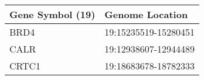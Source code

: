 \begin{tabular}{ll}
\toprule
Gene Symbol (19) &      Genome Location \\
\midrule
            BRD4 & 19:15235519-15280451 \\
            CALR & 19:12938607-12944489 \\
           CRTC1 & 19:18683678-18782333 \\
\bottomrule
\end{tabular}
